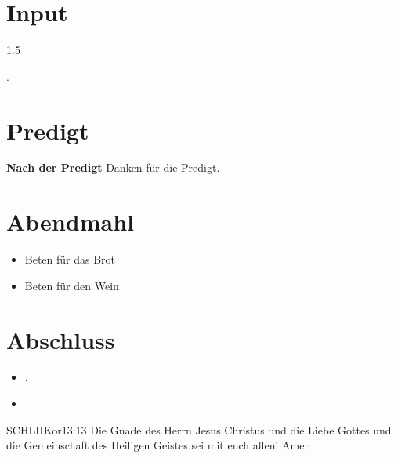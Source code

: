 \documentclass[fontsize=14pt]{mybib}
\begin{document}
\section{Input}
\begin{spacing}{1.5}
    
    
    
    .
\end{spacing}
\section{Predigt}
\textbf{Nach der Predigt}\newline
Danken für die Predigt.
\section{Abendmahl}
\begin{itemize}
    \item [] Beten für das Brot
    \item [] Beten für den Wein
\end{itemize}
\section{Abschluss}
\begin{itemize}
    \item [] .
    \item [] 
\end{itemize}
\begin{bibelbox}{SCHL}{IIKor}{13:13}
    Die Gnade des Herrn Jesus Christus und die Liebe Gottes und die Gemeinschaft des Heiligen Geistes sei mit euch allen! Amen
\end{bibelbox}
\end{document}
